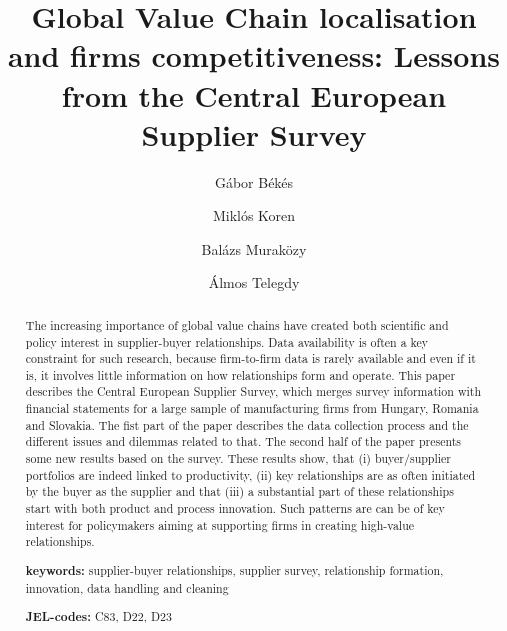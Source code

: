 \documentclass[final, dvipsnames, authoryear,12pt]{elsarticle}
\begin{document}
\begin{frontmatter}
\title{Global Value Chain localisation and firms competitiveness: Lessons from the Central European Supplier Survey}






\author[gb]{G\'{a}bor B\'{e}k\'{e}s}
\author[mk]{Miklós Koren}
\author[bm]{Balázs Muraközy}
\author[at]{Álmos Telegdy}
 \address[gb]{Central European University, Institute of Economics and CEPR}
 \address[mk]{Central European University, Institute of Economics and CEPR}
 \address[bm]{University of Liverpool, Institute of Economics }
 \address[at]{National Bank of Hungary}
 
 




\begin{abstract}
    The increasing importance of global value chains have created both scientific and policy interest in supplier-buyer relationships. Data availability is often a key constraint for such research, because firm-to-firm data is rarely available and even if it is, it involves little information on how relationships form and operate. This paper describes the Central European Supplier Survey, which merges survey information with financial statements for a large sample of manufacturing firms from Hungary, Romania and Slovakia. The fist part of the paper describes the data collection process and the different issues and dilemmas related to that. The second half of the paper presents some new results based on the survey. These results show, that (i) buyer/supplier portfolios are indeed linked to productivity, (ii) key relationships are as often initiated by the buyer as the supplier and that (iii) a substantial part of these relationships start with both product and process innovation. Such patterns are can be of key interest for policymakers aiming at supporting firms in creating high-value relationships.
    
       \vspace{2mm} 
   
   \textbf{keywords:} supplier-buyer relationships, supplier survey, relationship formation, innovation, data handling and cleaning 
   
    \vspace{2mm}
    
   \textbf{JEL-codes:} C83, D22, D23 
\end{abstract}


\end{frontmatter}
\end{document}
